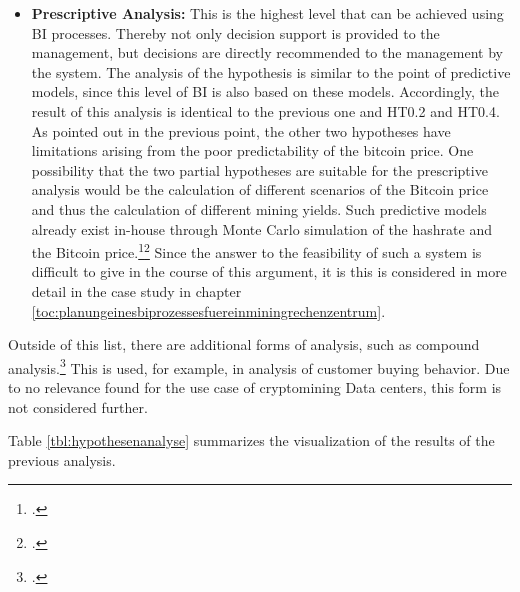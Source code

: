 \begin{itemize}
    Accordingly, it can be concluded that \ac{HT0.2} and \ac{HT0.4} are suitable for predictive models, as these exclusively use \acp{KPI}
    which can be simulated with sufficient quality. For \ac{HT0.1} and \ac{HT0.3}, predictive models can also be applied,
    where a limit can be established by predicting the bitcoin price. This can be improved by a suitable combination of the
    analysis models. If it is possible to suitably analyze the unstructured and inconsistent data from social media platforms,
    these should be integrated into the predictive modeling. To get the best possible impression of the \ac{BTC} price,
    it is important to work with real-time processing of this data.
    \item \textbf{Prescriptive Analysis: }This is the highest level that can be achieved using \ac{BI} processes. Thereby
    not only decision support is provided to the management, but decisions are directly recommended to the management by the system.
    The analysis of the hypothesis is similar to the point of predictive models, since this level of \ac{BI} is also based on these models.
    Accordingly, the result of this analysis is identical to the previous one and \ac{HT0.2} and \ac{HT0.4}. 
    As pointed out in the previous point, the other two hypotheses have limitations arising from
    the poor predictability of the bitcoin price. One possibility that the two partial hypotheses are suitable for the
    prescriptive analysis would be the calculation of different scenarios of the Bitcoin price and thus the calculation of
    different mining yields. Such predictive models already exist in-house through Monte Carlo simulation of the hashrate
    and the Bitcoin price.\footcite[Cf.][]{appendix:mcpreis}\footcite[Cf.][]{appendix:mchashrate}
    Since the answer to the feasibility of such a system is difficult to give in the course of this argument, it is
    this is considered in more detail in the case study in chapter \ref{toc:planungeinesbiprozessesfuereinminingrechenzentrum}.
\end{itemize}

Outside of this list, there are additional forms of analysis, such as compound analysis.\footcite[Cf.][p. 97]{bihani2014comparative}
This is used, for example, in analysis of customer buying behavior. Due to no relevance found for the use case of cryptomining
Data centers, this form is not considered further.

Table \ref{tbl:hypothesenanalyse} summarizes the visualization of the results of the previous analysis.

